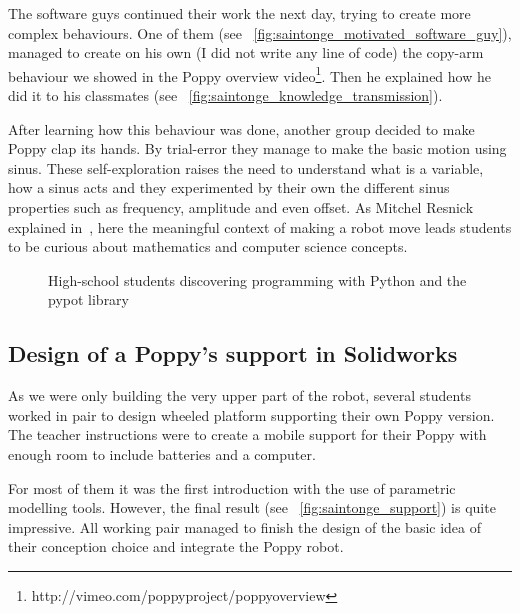 The software guys continued their work the next day, trying to create more complex behaviours. One of them (see \figurename~\ref{fig:saintonge_motivated_software_guy}), managed to create on his own (I did not write any line of code) the copy-arm behaviour we showed in the Poppy overview video\footnote{http://vimeo.com/poppyproject/poppyoverview}. Then he explained how he did it to his classmates (see \figurename~\ref{fig:saintonge_knowledge_transmission}).

After learning how this behaviour was done, another group decided to make Poppy clap its hands. By trial-error they manage to make the basic motion using sinus. These self-exploration raises the need to understand what is a variable, how a sinus acts and they experimented by their own the different sinus properties such as frequency, amplitude and even offset. As Mitchel Resnick explained in~\cite{resnick2009scratch}, here the meaningful context of making a robot move leads students to be curious about mathematics and computer science concepts.


\begin{figure}[]
\centering
    \hfil
    \hfil
    \hfil
    \caption{High-school students discovering programming with Python and the pypot library}
    \label{fig:saintonge_software}
\end{figure}

\subsection{Design of a Poppy's support in Solidworks} %

As we were only building the very upper part of the robot, several students worked in pair to design wheeled platform supporting their own Poppy version. The teacher instructions were to create a mobile support for their Poppy with enough room to include batteries and a computer.

For most of them it was the first introduction with the use of parametric modelling tools. However, the final result (see \figurename~\ref{fig:saintonge_support}) is quite impressive. All working pair managed to finish the design of the basic idea of their conception choice and integrate the Poppy robot.

